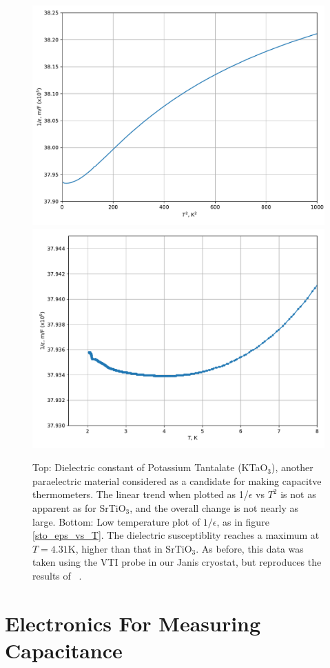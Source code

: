 \documentclass{thesis-umich}
\begin{document}
\begin{figure} \caption[Dielectric constant of Potassium Tantalate]{Top: Dielectric constant of Potassium Tantalate
		(KTaO$_3$), another paraelectric material considered as a
		candidate for making capacitve thermometers. The linear trend
		when plotted as 1/$\epsilon$ vs $T^2$ is not as apparent as for
		SrTiO$_3$, and the overall change is not nearly as large.
		Bottom: Low temperature plot of $1/\epsilon$, as in figure
		\ref{sto_eps_vs_T}. The dielectric susceptiblity reaches a
		maximum at $T = 4.31$K, higher than that in SrTiO$_3$. As
		before, this data was taken using the VTI probe in our Janis
		cryostat, but reproduces the results of ~\cite{Rowley2014}.}
	
	\includegraphics[width=0.85\columnwidth]{figures/KTO_eps_vs_T.pdf}
	\includegraphics[width=0.85\columnwidth]{figures/KTO_eps_vs_T_low.pdf}
\end{figure}

\section{Electronics For Measuring Capacitance}
\end{document}
